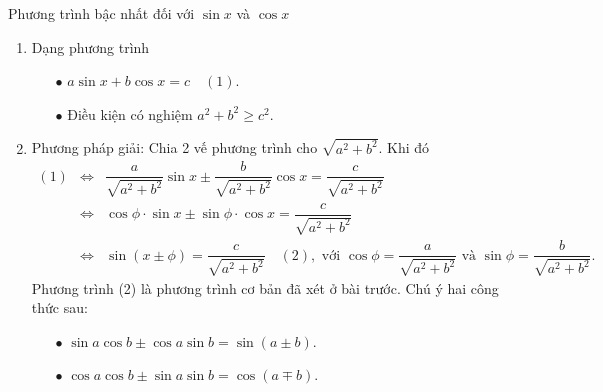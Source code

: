 
\begin{dang}{Phương trình bậc nhất đối với $\sin x$ và $\cos x$ }
	\begin{enumerate}
		\item Dạng phương trình
			\begin{itemize}
				\item [$\bullet$] $a \sin x + b \cos x =c \quad (1)$.
				\item [$\bullet$] Điều kiện có nghiệm $a^2+b^2 \ge c^2$.
			\end{itemize}
 		\item Phương pháp giải: Chia 2 vế phương trình cho $\sqrt{a^2+b^2}$. Khi đó
		\begin{eqnarray*}
			(1)&\Leftrightarrow&
			\dfrac{a}{\sqrt{a^2+b^2}} \sin x \pm \dfrac{b}{\sqrt{a^2+b^2}} \cos x=\dfrac{c}{\sqrt{a^2+b^2}}\\
			&\Leftrightarrow& \cos \phi \cdot \sin x \pm \sin \phi \cdot \cos x =\dfrac{c}{\sqrt{a^2+b^2}}\\
			&\Leftrightarrow& \sin \left(x \pm \phi \right)=\dfrac{c}{\sqrt{a^2+b^2}} \quad(2), \text{ với }\cos \phi=\dfrac{a}{\sqrt{a^2+b^2}} \text{ và } \sin \phi=\dfrac{b}{\sqrt{a^2+b^2}}.
		\end{eqnarray*}
		Phương trình (2) là phương trình cơ bản đã xét ở bài trước.
				Chú ý hai công thức sau:
			\begin{itemize}
				\item [$\bullet$] $\sin a \cos b \pm \cos a \sin b =\sin(a \pm b)$.
				\item [$\bullet$] $\cos a \cos b \pm \sin a \sin b =\cos(a \mp b)$.
			\end{itemize}
	\end{enumerate}
\end{dang}

